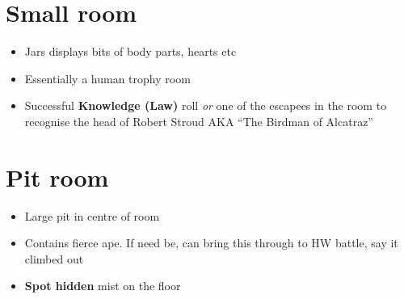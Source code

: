 \documentclass[12pt,a4paper]{article}
\begin{document}
\section*{Small room}
\begin{itemize}
\item{Jars displays bits of body parts, hearts etc}
\item{Essentially a human trophy room}
\item{Successful \textbf{Knowledge (Law)} roll \textit{or} one of the escapees in the room to recognise the head of Robert Stroud AKA ``The Birdman of Alcatraz''}
\end{itemize}
\section*{Pit room}
\begin{itemize}
\item{Large pit in centre of room}
\item{Contains fierce ape.  If need be, can bring this through to HW battle, say it climbed out}
\item{\textbf{Spot hidden} mist on the floor}
\end{itemize}
\newpage
\end{document}
